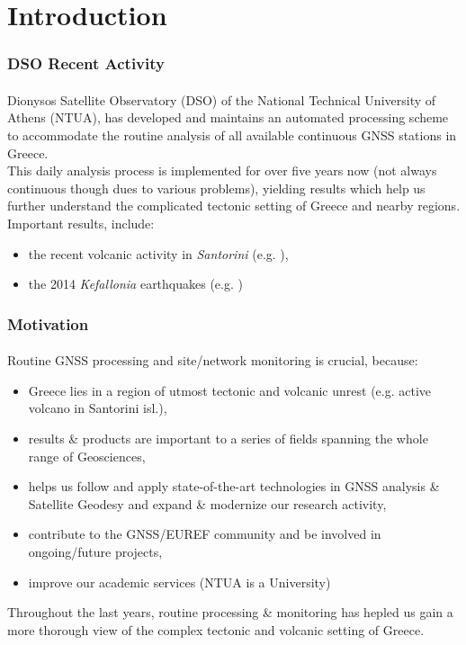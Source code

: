 \graphicspath{{Chapter1/Figs/}}

\section{Introduction}

\begin{frame}\frametitle{DSO Recent Activity}\framesubtitle{}
\vskip-1.5cm
  Dionysos Satellite Observatory (DSO) of the National Technical University of 
  Athens (NTUA), has developed and maintains an automated processing
  scheme to accommodate the routine analysis of all available continuous GNSS 
  stations in Greece.
  \\
  This daily analysis process is implemented for over five years now (not 
  always continuous though dues to various problems), yielding 
  results which help us further understand the complicated tectonic setting of 
  Greece and nearby regions.
  \\
  Important results, include:
  \begin{itemize}
    \item the recent volcanic activity in \emph{Santorini} (e.g. \cite{papoutsis}),
    \item the 2014 \emph{Kefallonia} earthquakes (e.g. \cite{anastasioukef})
  \end{itemize}
\end{frame}
%
\begin{frame}\frametitle{Motivation}\framesubtitle{}
\vskip-1cm
  Routine GNSS processing and site/network monitoring is crucial, because:
  \begin{itemize}
    \item Greece lies in a region of utmost tectonic and volcanic unrest (e.g. 
      active volcano in Santorini isl.),
    \item results \& products are important to a series of fields spanning 
      the whole range of Geosciences,
    \item helps us follow and apply state-of-the-art technologies in GNSS analysis 
      \& Satellite Geodesy and expand \& modernize our research activity,
    \item contribute to the GNSS/EUREF community and be involved in ongoing/future projects,
    \item improve our academic services (NTUA is a University)
  \end{itemize}
  Throughout the last years, routine processing \& monitoring has hepled us gain 
  a more thorough view of the complex tectonic and volcanic setting of Greece.
\end{frame}

